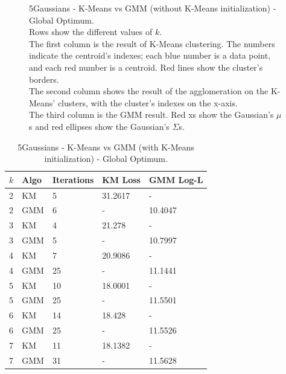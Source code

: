 \documentclass[a4paper,11pt]{article}
\begin{document}
\begin{figure}
    \caption{\small{5Gaussians - K-Means vs GMM (without K-Means initialization) - Global Optimum.
            \\ Rows show the different values of $k$.
            \\The first column is the result of K-Means clustering. The numbers indicate the centroid's indexes; each blue number is a data point, and each red number is a centroid. Red lines show the cluster's borders.
            \\The second column shows the result of the agglomeration on the K-Means' clusters, with the cluster's indexes on the x-axis.
            \\The third column is the GMM result. Red xs show the Gaussian's $\mu$s and red ellipses show the Gaussian's $\Sigma$s.}}
    \label{fig:assignment7_3}
\end{figure}

\begin{table}
    \centering
    \begin{tabularx}{\textwidth}{X|X|X|X|X}
        $k$ & Algo & Iterations & KM Loss & GMM Log-L \\
        \hline
        2   & KM   & 5          & 31.2617      & - \\
        2   & GMM  & 6          & -            & 10.4047 \\
        
        3   & KM   & 4          & 21.278       & - \\
        3   & GMM  & 5          & -            & 10.7997 \\
        
        4   & KM   & 7          & 20.9086      & - \\
        4   & GMM  & 25         & -            & 11.1441 \\
        
        5   & KM   & 10         & 18.0001      & - \\
        5   & GMM  & 25         & -            & 11.5501 \\
        
        6   & KM   & 14         & 18.428       & - \\
        6   & GMM  & 25         & -            & 11.5526 \\
        
        7   & KM   & 11         & 18.1382      & - \\
        7   & GMM  & 31         & -            & 11.5628
    \end{tabularx}
    \caption{\small{5Gaussians - K-Means vs GMM (with K-Means initialization) - Global Optimum.}}
    \label{tab:assignment7_1}
\end{table}
\end{document}
